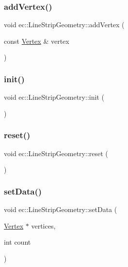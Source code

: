 \subsubsection{\texorpdfstring{add\+Vertex()}{addVertex()}}
{\footnotesize\ttfamily void ec\+::\+Line\+Strip\+Geometry\+::add\+Vertex (\begin{DoxyParamCaption}\item[{const \mbox{\hyperlink{structec_1_1_vertex}{Vertex}} \&}]{vertex }\end{DoxyParamCaption})}

\mbox{\label{classec_1_1_line_strip_geometry_a8dac12c33ec187961ba4ac1573d718a5}} 
\subsubsection{\texorpdfstring{init()}{init()}}
{\footnotesize\ttfamily void ec\+::\+Line\+Strip\+Geometry\+::init (\begin{DoxyParamCaption}{ }\end{DoxyParamCaption})}

\mbox{\label{classec_1_1_line_strip_geometry_abaf125f40af2b979e4b3af3939bb0a0e}} 
\subsubsection{\texorpdfstring{reset()}{reset()}}
{\footnotesize\ttfamily void ec\+::\+Line\+Strip\+Geometry\+::reset (\begin{DoxyParamCaption}{ }\end{DoxyParamCaption})}

\mbox{\label{classec_1_1_line_strip_geometry_ae55bfbf2b8dc1055edc22329601483e0}} 
\subsubsection{\texorpdfstring{set\+Data()}{setData()}}
{\footnotesize\ttfamily void ec\+::\+Line\+Strip\+Geometry\+::set\+Data (\begin{DoxyParamCaption}\item[{\mbox{\hyperlink{structec_1_1_vertex}{Vertex}} $\ast$}]{vertices,  }\item[{int}]{count }\end{DoxyParamCaption})}



